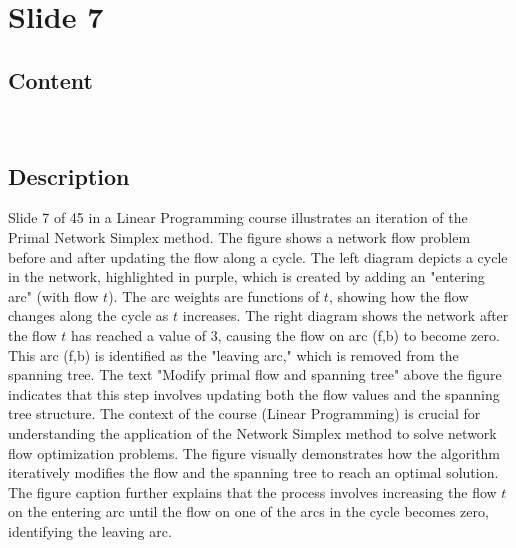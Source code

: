 \documentclass{article}%
\begin{document}
%
\newpage%
\section{Slide 7}%
\label{sec:Slide7}%
\subsection{Content}%

\underline{} \\
%
\subsection{Description}%
Slide 7 of 45 in a Linear Programming course illustrates an iteration of the Primal Network Simplex method. The figure shows a network flow problem before and after updating the flow along a cycle. The left diagram depicts a cycle in the network, highlighted in purple, which is created by adding an "entering arc" (with flow $t$). The arc weights are functions of $t$, showing how the flow changes along the cycle as $t$ increases. The right diagram shows the network after the flow $t$ has reached a value of 3, causing the flow on arc (f,b) to become zero. This arc (f,b) is identified as the "leaving arc," which is removed from the spanning tree. The text "Modify primal flow and spanning tree" above the figure indicates that this step involves updating both the flow values and the spanning tree structure. The context of the course (Linear Programming) is crucial for understanding the application of the Network Simplex method to solve network flow optimization problems. The figure visually demonstrates how the algorithm iteratively modifies the flow and the spanning tree to reach an optimal solution. The figure caption further explains that the process involves increasing the flow $t$ on the entering arc until the flow on one of the arcs in the cycle becomes zero, identifying the leaving arc.%
\end{document}
